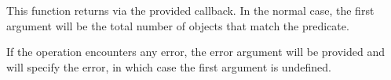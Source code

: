 This function returns via the provided callback.  In the normal case, the first
argument will be the total number of objects that match the predicate.

If the operation encounters any error, the error argument will be provided and
will specify the error, in which case the first argument is undefined.
